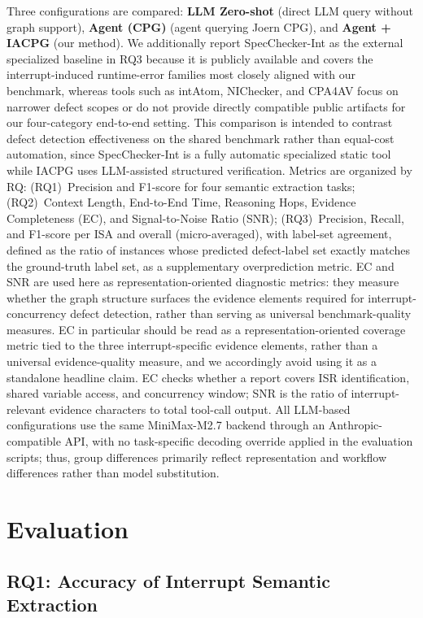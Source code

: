 \documentclass[conference]{IEEEtran}
\begin{document}
Three configurations are compared: \textbf{LLM Zero-shot} (direct LLM query without graph support), \textbf{Agent (CPG)} (agent querying Joern CPG), and \textbf{Agent + IACPG} (our method). We additionally report SpecChecker-Int as the external specialized baseline in RQ3 because it is publicly available and covers the interrupt-induced runtime-error families most closely aligned with our benchmark, whereas tools such as intAtom, NIChecker, and CPA4AV focus on narrower defect scopes or do not provide directly compatible public artifacts for our four-category end-to-end setting. This comparison is intended to contrast defect detection effectiveness on the shared benchmark rather than equal-cost automation, since SpecChecker-Int is a fully automatic specialized static tool while IACPG uses LLM-assisted structured verification. Metrics are organized by RQ: (RQ1)~Precision and F1-score for four semantic extraction tasks; (RQ2)~Context Length, End-to-End Time, Reasoning Hops, Evidence Completeness (EC), and Signal-to-Noise Ratio (SNR); (RQ3)~Precision, Recall, and F1-score per ISA and overall (micro-averaged), with label-set agreement, defined as the ratio of instances whose predicted defect-label set exactly matches the ground-truth label set, as a supplementary overprediction metric. EC and SNR are used here as representation-oriented diagnostic metrics: they measure whether the graph structure surfaces the evidence elements required for interrupt-concurrency defect detection, rather than serving as universal benchmark-quality measures. EC in particular should be read as a representation-oriented coverage metric tied to the three interrupt-specific evidence elements, rather than a universal evidence-quality measure, and we accordingly avoid using it as a standalone headline claim. EC checks whether a report covers ISR identification, shared variable access, and concurrency window; SNR is the ratio of interrupt-relevant evidence characters to total tool-call output. All LLM-based configurations use the same MiniMax-M2.7 backend through an Anthropic-compatible API, with no task-specific decoding override applied in the evaluation scripts; thus, group differences primarily reflect representation and workflow differences rather than model substitution.

\section{Evaluation}

\subsection{RQ1: Accuracy of Interrupt Semantic Extraction}
\end{document}

